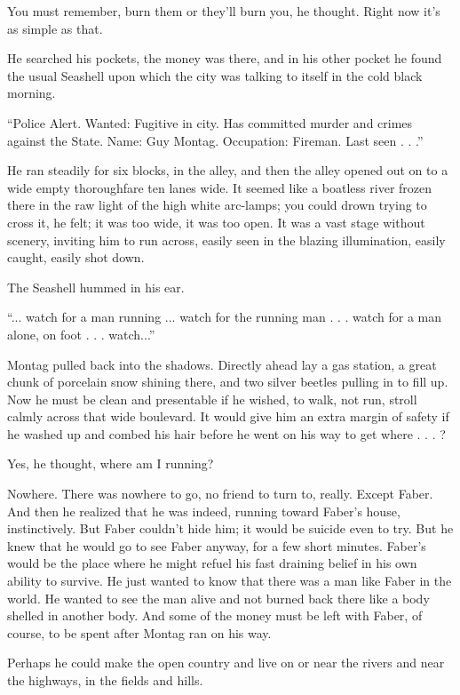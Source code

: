 \documentclass[11pt,openany]{book}
\begin{document}
You must remember, burn them or they'll burn you, he thought. Right now it's as simple as that.

He searched his pockets, the money was there, and in his other pocket he found the usual Seashell upon which the city was talking to itself in the cold black morning.

``Police Alert. Wanted: Fugitive in city. Has committed murder and crimes against the State. Name: Guy Montag. Occupation: Fireman. Last seen . . .''

He ran steadily for six blocks, in the alley, and then the alley opened out on to a wide empty thoroughfare ten lanes wide. It seemed like a boatless river frozen there in the raw light of the high white arc-lamps; you could drown trying to cross it, he felt; it was too wide, it was too open. It was a vast stage without scenery, inviting him to run across, easily seen in the blazing illumination, easily caught, easily shot down.

The Seashell hummed in his ear.

``... watch for a man running ... watch for the running man . . . watch for a man alone, on foot . . . watch...''

Montag pulled back into the shadows. Directly ahead lay a gas station, a great chunk of porcelain snow shining there, and two silver beetles pulling in to fill up. Now he must be clean and presentable if he wished, to walk, not run, stroll calmly across that wide boulevard. It would give him an extra margin of safety if he washed up and combed his hair before he went on his way to get where . . . ?

Yes, he thought, where am I running?

Nowhere. There was nowhere to go, no friend to turn to, really. Except Faber. And then he realized that he was indeed, running toward Faber's house, instinctively. But Faber couldn't hide him; it would be suicide even to try. But he knew that he would go to see Faber anyway, for a few short minutes. Faber's would be the place where he might refuel his fast draining belief in his own ability to survive. He just wanted to know that there was a man like Faber in the world. He wanted to see the man alive and not burned back there like a body shelled in another body. And some of the money must be left with Faber, of course, to be spent after Montag ran on his way.

Perhaps he could make the open country and live on or near the rivers and near the highways, in the fields and hills.
\end{document}
